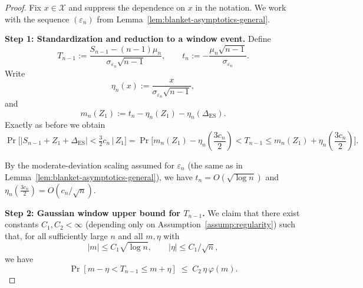\documentclass{article}
\theoremstyle{plain}
\theoremstyle{definition}
\begin{document}
\begin{proof}

Fix $x\in\mathcal X$ and suppress the dependence on $x$ in the notation.
We work with the sequence $(\varepsilon_n)$ from
Lemma~\ref{lem:blanket-asymptotics-general}.

\medskip

\noindent
\textbf{Step 1: Standardization and reduction to a window event.}
Define
\[
  T_{n-1}
  := \frac{S_{n-1} - (n-1)\mu_n}{\sigma_{\varepsilon_n}\sqrt{n-1}},
  \qquad
  t_n := -\frac{\mu_n\sqrt{n-1}}{\sigma_{\varepsilon_n}}.
\]
Write
\[
  \eta_n(x)
  := \frac{x}{\sigma_{\varepsilon_n}\sqrt{n-1}},
\]
and
\[
  m_n(Z_1) := t_n - \eta_n(Z_1) - \eta_n(\Delta_{\mathrm{ES}}).
\]
Exactly as before we obtain
\begin{equation}
  \label{eq:band-window-bigO}
  \Pr\bigl[
    |S_{n-1} + Z_1 + \Delta_{\mathrm{ES}}|
    < \tfrac{3}{2}c_n
    \,\big|\,
    Z_1
  \bigr]
  =
  \Pr\bigl[
    m_n(Z_1)-\eta_n\left(\frac{3 c_n}{2}\right) < T_{n-1} \le m_n(Z_1)+\eta_n\left(\frac{3 c_n}{2}\right)
  \bigr].
\end{equation}

By the moderate-deviation scaling assumed for $\varepsilon_n$ (the same
as in Lemma~\ref{lem:blanket-asymptotics-general}), we have
$t_n=O(\sqrt{\log n})$ and $\eta_n\left(\frac{3 c_n}{2}\right)=O(c_n/\sqrt{n})$.

\medskip

\noindent
\textbf{Step 2: Gaussian window upper bound for $T_{n-1}$.}
We claim that there exist constants $C_1,C_2<\infty$ (depending only on
Assumption~\ref{assump:regularity}) such that, for all sufficiently
large $n$ and all $m,\eta$ with
\begin{equation}
  \label{eq:md-region}
  |m|\le C_1\sqrt{\log n},
  \qquad
  |\eta|\le C_1/\sqrt{n},
\end{equation}
we have
\begin{equation}
  \label{eq:gauss-window-bound}
  \Pr\left[m-\eta < T_{n-1} \le m+\eta\right]
  \;\le\;
  C_2\,\eta\,\varphi(m).
\end{equation}



\end{proof}
\end{document}

